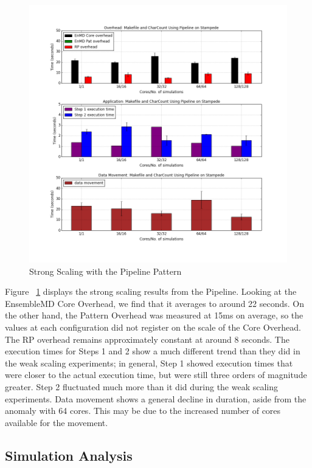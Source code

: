 \documentclass[]{article}
\begin{document}
		\begin{figure}[H]
			\centering
			\includegraphics[scale=.30]{img/pipeline_strong_scaling.png}
			\caption{Strong Scaling with the Pipeline Pattern}
			\label{fig:pipeline_strong_scaling}
		\end{figure}

		Figure ~\ref{fig:pipeline_strong_scaling} displays the strong scaling results from the Pipeline. Looking at the EnsembleMD Core Overhead, we find that it averages to around 22 seconds. On the other hand, the Pattern Overhead was measured at 15ms on average, so the values at each configuration did not register on the scale of the Core Overhead. The RP overhead remains approximately constant at around 8 seconds. The execution times for Steps 1 and 2 show a much different trend than they did in the weak scaling experiments; in general, Step 1 showed execution times that were closer to the actual execution time, but were still three orders of magnitude greater. Step 2 fluctuated much more than it did during the weak scaling experiments.
		Data movement shows a general decline in duration, aside from the anomaly with 64 cores. This may be due to the increased number of cores available for the movement.

	\subsection{Simulation Analysis}
\end{document}
